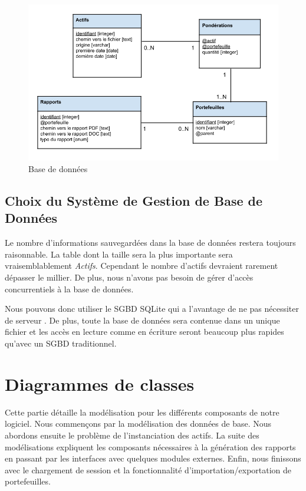 \documentclass[a4paper,titlepage,french]{report}
\begin{document}
\begin{figure}
  	\center
  	\includegraphics[width=1\textwidth]{base-donnees.png}
  	\caption{Base de données}
  	\label{fig:base-donnees}
\end{figure}


\subsection{Choix du Système de Gestion de Base de Données}

Le nombre d'informations sauvegardées dans la base de données restera toujours raisonnable.
La table dont la taille sera la plus importante sera vraisemblablement \textit{Actifs}.
Cependant le nombre d'actifs devraient rarement dépasser le millier.
De plus, nous n'avons pas besoin de gérer d'accès concurrentiels à la base de données.

Nous pouvons donc utiliser le SGBD SQLite qui a l'avantage de ne pas nécessiter de serveur \cite{website:SQLite}.
De plus, toute la base de données sera contenue dans un unique fichier et les accès en lecture comme en écriture seront beaucoup plus rapides qu'avec un SGBD traditionnel.


\section{Diagrammes de classes}

Cette partie détaille la modélisation pour les différents composants de notre logiciel.
Nous commençons par la modélisation des données de base. Nous abordons ensuite le problème de l'instanciation des actifs.
La suite des modélisations expliquent les composants nécessaires à la génération des rapports en passant par les interfaces avec quelques modules externes.
Enfin, nous finissons avec le chargement de session et la fonctionnalité d'importation/exportation de portefeuilles.
\end{document}
